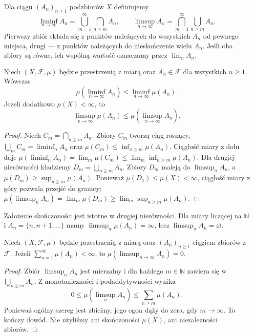 \begin{definicja}
\label{def:limsup-sets}
Dla ciągu $(A_n)_{n\geq1}$ podzbiorów $X$ definiujemy
\[
\liminf_{n\to\infty}A_n
=\bigcup_{m=1}^{\infty}\bigcap_{n\geq m}A_n,
\qquad
\limsup_{n\to\infty}A_n
=\bigcap_{m=1}^{\infty}\bigcup_{n\geq m}A_n.
\]
Pierwszy zbiór składa się z punktów należących do wszystkich
$A_n$ od pewnego miejsca, drugi --- z punktów należących do
nieskończenie wielu $A_n$. Jeśli oba zbiory są równe,
ich wspólną wartość oznaczamy przez $\lim_nA_n$.
\end{definicja}

\begin{twierdzenie}
\label{thm:fatou-for-sets}
Niech $(X,\mathcal F,\mu)$ będzie przestrzenią z miarą
oraz $A_n\in\mathcal F$ dla wszystkich $n\ge1$.
Wówczas
\[
 \mu(\liminf_{n\to\infty}A_n)
 \le \liminf_{n\to\infty}\mu(A_n).
\]
Jeżeli dodatkowo $\mu(X)<\infty$, to
\[
 \limsup_{n\to\infty}\mu(A_n)
 \le \mu(\limsup_{n\to\infty}A_n).
\]
\end{twierdzenie}
\begin{proof}
Niech $C_m=\bigcap_{n\ge m}A_n$.
Zbiory $C_m$ tworzą ciąg rosnący,
$\bigcup_m C_m=\liminf_n A_n$ oraz
$\mu(C_m)\le\inf_{n\ge m}\mu(A_n)$.
Ciągłość miary z dołu daje
$\mu(\liminf_n A_n)=\lim_m\mu(C_m)
\le\lim_m\inf_{n\ge m}\mu(A_n)$.
Dla drugiej nierówności kładziemy
$D_m=\bigcup_{n\ge m}A_n$.
Zbiory $D_m$ maleją do $\limsup_n A_n$,
a $\mu(D_m)\ge\sup_{n\ge m}\mu(A_n)$.
Ponieważ $\mu(D_1)\le\mu(X)<\infty$,
ciągłość miary z góry pozwala przejść do granicy:
$\mu(\limsup_n A_n)=\lim_m\mu(D_m)
\ge\lim_m\sup_{n\ge m}\mu(A_n)$.
\end{proof}
\begin{uwaga}
Założenie skończoności jest istotne w drugiej nierówności.
Dla miary liczącej na $\mathbb N$ i
$A_n=\{n,n+1,\ldots\}$ mamy
$\limsup_n\mu(A_n)=\infty$, lecz
$\limsup_n A_n=\varnothing$.
\end{uwaga}

\begin{twierdzenie}
\label{thm:borel-cantelli-1}
Niech $(X,\mathcal F,\mu)$ będzie przestrzenią z miarą
oraz $(A_n)_{n\geq1}$ ciągiem zbiorów z $\mathcal F$.
Jeżeli $\sum_{n=1}^{\infty}\mu(A_n)<\infty$, to
$\mu(\limsup_{n\to\infty}A_n)=0$.
\end{twierdzenie}
\begin{proof}
Zbiór $\limsup_nA_n$ jest mierzalny i dla każdego
$m\in\mathbb N$ zawiera się w $\bigcup_{n\geq m}A_n$.
Z monotoniczności i podaddytywności wynika
\[
0\leq\mu(\limsup_nA_n)
\leq\sum_{n\geq m}\mu(A_n).
\]
Ponieważ ogólny szereg jest zbieżny, jego ogon dąży do zera,
gdy $m\to\infty$. To kończy dowód. Nie użyliśmy ani
skończoności $\mu(X)$, ani niezależności zbiorów.
\end{proof}

